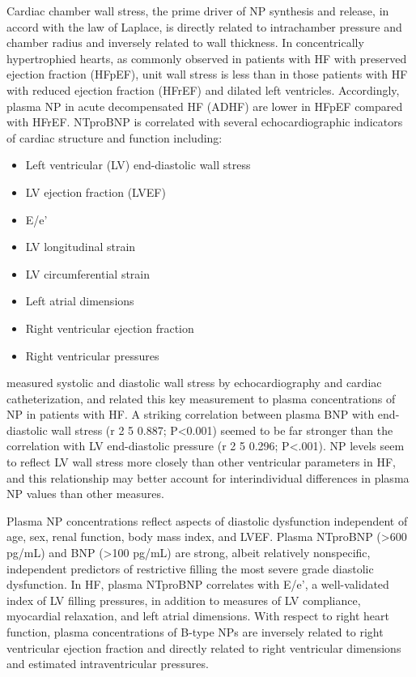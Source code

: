 \documentclass[14pt,a4paper,onecolumn]{extarticle}
\begin{document}
Cardiac chamber wall stress, the prime driver of NP synthesis and release, in accord with the law of Laplace, is directly related to intrachamber pressure and chamber radius and inversely related to wall thickness. In concentrically hypertrophied hearts, as commonly observed in patients with HF with preserved ejection fraction (HFpEF), unit wall stress is less than in those patients with HF with reduced ejection fraction (HFrEF) and dilated left ventricles. Accordingly, plasma NP in acute decompensated HF (ADHF) are lower in HFpEF compared with HFrEF. NTproBNP is correlated with several echocardiographic indicators of cardiac structure and function including: \begin{itemize}   \item Left ventricular (LV) end-diastolic wall stress   \item LV ejection fraction (LVEF)   \item E/e’   \item LV longitudinal strain   \item LV circumferential strain   \item Left atrial dimensions   \item Right ventricular ejection fraction   \item Right ventricular pressures \end{itemize} \citep{Richards2018}

\citep{Iwanaga2006} measured systolic and diastolic wall stress by echocardiography and cardiac catheterization, and related this key measurement to plasma concentrations of NP in patients with HF. A striking correlation between plasma BNP with end-diastolic wall stress (r 2 5 0.887; P<0.001) seemed to be far stronger than the correlation with LV end-diastolic pressure (r 2 5 0.296; P<.001). NP levels seem to reflect LV wall stress more closely than other ventricular parameters in HF, and this relationship may better account for interindividual differences in plasma NP values than other measures.

Plasma NP concentrations reflect aspects of diastolic dysfunction independent of age, sex, renal function, body mass index, and LVEF. Plasma NTproBNP (>600 pg/mL) and BNP (>100 pg/mL) are strong, albeit relatively nonspecific, independent predictors of restrictive filling the most severe grade diastolic dysfunction. In HF, plasma NTproBNP correlates with E/e’, a well-validated index of LV filling pressures, in addition to measures of LV compliance, myocardial relaxation, and left atrial dimensions. With respect to right heart function, plasma concentrations of B-type NPs are inversely related to right ventricular ejection fraction and directly related to right ventricular dimensions and estimated intraventricular pressures. \citep{Troughton2009}
\end{document}
